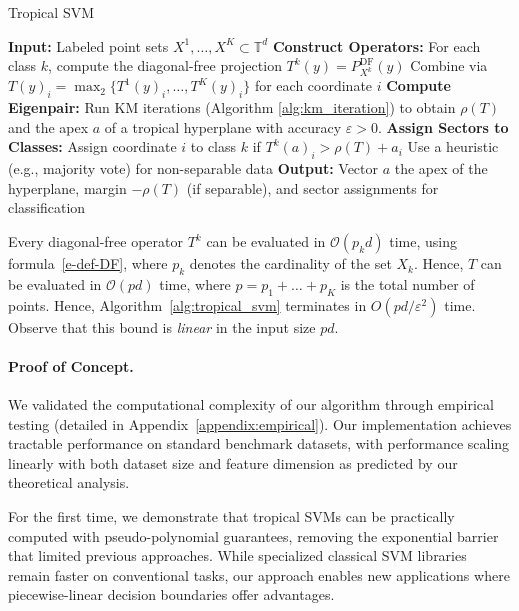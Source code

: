 \documentclass{article}
\newcommand{\trop}{\mathbb{T}}
\begin{document}
\begin{algorithm}
\caption{Tropical SVM}\label{alg:tropical_svm}
\begin{algorithmic}[1]
\STATE \textbf{Input:} Labeled point sets $X^1,\dots,X^K \subset \trop^d$
\STATE \textbf{Construct Operators:}
  \STATE \quad For each class $k$, compute the diagonal-free projection $T^k(y) = P^{\textrm{DF}}_{X^k}(y)$
  \STATE \quad Combine via $T(y)_i = \operatorname{\max}_2\{T^1(y)_i, \dots, T^K(y)_i\}$ for each coordinate $i$
\STATE \textbf{Compute Eigenpair:}
  \STATE \quad Run KM iterations (Algorithm \ref{alg:km_iteration}) to obtain $\rho(T)$ and the apex $a$ of a tropical hyperplane with accuracy $\varepsilon>0$.
\STATE \textbf{Assign Sectors to Classes:}
    \STATE Assign coordinate $i$ to class $k$ if $T^k(a)_i > \rho(T) + a_i$
  \ELSE
    \STATE Use a heuristic (e.g., majority vote) for non-separable data
  \ENDIF
\STATE \textbf{Output:} Vector $a$ the apex of the hyperplane, margin $-\rho(T)$ (if separable), and sector assignments for classification
\end{algorithmic}
\end{algorithm}
Every diagonal-free operator $T^k$ can be evaluated in $\mathcal{O}(p_k d)$ time, using formula~\eqref{e-def-DF},
where $p_k$ denotes the cardinality of the set $X_k$. Hence, $T$ can be evaluated in
$\mathcal{O}(pd)$ time, where $p=p_1+\dots+p_K$ is the total number of points.
Hence, Algorithm~\ref{alg:tropical_svm} terminates in $O(pd/\varepsilon^2)$ time. Observe
that this bound is {\em linear} in the input size $pd$.

\paragraph{Proof of Concept.}
We validated the computational complexity of our algorithm through empirical testing (detailed in Appendix~\ref{appendix:empirical}). Our implementation achieves tractable performance on standard benchmark datasets, with performance scaling linearly with both dataset size and feature dimension as predicted by our theoretical analysis.

For the first time, we demonstrate that tropical SVMs can be practically computed with pseudo-polynomial guarantees, removing the exponential barrier that limited previous approaches. While specialized classical SVM libraries remain faster on conventional tasks, our approach enables new applications where piecewise-linear decision boundaries offer advantages.
\end{document}
